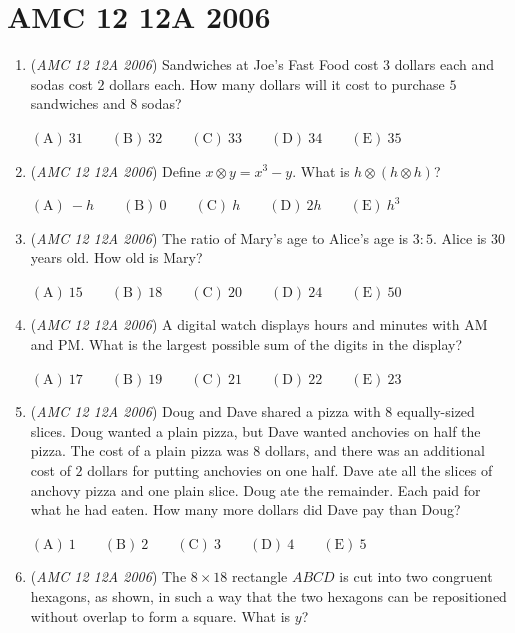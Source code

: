 \section{AMC 12 12A 2006}
        \begin{enumerate}
        	\item (\textit{AMC 12 12A 2006}) Sandwiches at Joe's Fast Food cost $3$ dollars each and sodas cost $2$ dollars each. How many dollars will it cost to purchase $5$ sandwiches and $8$ sodas?


 $\mathrm{(A) \ } 31\qquad \mathrm{(B) \ } 32\qquad \mathrm{(C) \ } 33\qquad \mathrm{(D) \ } 34\qquad \mathrm{(E) \ } 35$


	\item (\textit{AMC 12 12A 2006}) Define $x\otimes y=x^3-y$. What is $h\otimes (h\otimes h)$?


 $\mathrm{(A) \ } -h\qquad \mathrm{(B) \ } 0\qquad \mathrm{(C) \ } h\qquad \mathrm{(D) \ } 2h\qquad \mathrm{(E) \ }  h^3$


	\item (\textit{AMC 12 12A 2006}) The ratio of Mary's age to Alice's age is $3:5$. Alice is $30$ years old. How old is Mary?


 $\mathrm{(A) \ } 15\qquad \mathrm{(B) \ } 18\qquad \mathrm{(C) \ } 20\qquad \mathrm{(D) \ } 24\qquad \mathrm{(E) \ }  50$


	\item (\textit{AMC 12 12A 2006}) A digital watch displays hours and minutes with AM and PM. What is the largest possible sum of the digits in the display?


 $\mathrm{(A) \ } 17\qquad \mathrm{(B) \ } 19\qquad \mathrm{(C) \ } 21\qquad \mathrm{(D) \ } 22\qquad \mathrm{(E) \ }  23$


	\item (\textit{AMC 12 12A 2006}) Doug and Dave shared a pizza with $8$ equally-sized slices. Doug wanted a plain pizza, but Dave wanted anchovies on half the pizza. The cost of a plain pizza was $8$ dollars, and there was an additional cost of $2$ dollars for putting anchovies on one half. Dave ate all the slices of anchovy pizza and one plain slice. Doug ate the remainder. Each paid for what he had eaten. How many more dollars did Dave pay than Doug?


 $\mathrm{(A) \ } 1\qquad \mathrm{(B) \ } 2\qquad \mathrm{(C) \ } 3\qquad \mathrm{(D) \ } 4\qquad \mathrm{(E) \ }  5$


	\item (\textit{AMC 12 12A 2006}) The $8\times 18$ rectangle $ABCD$ is cut into two congruent hexagons, as shown, in such a way that the two hexagons can be repositioned without overlap to form a square. What is $y$?


\end{enumerate}
